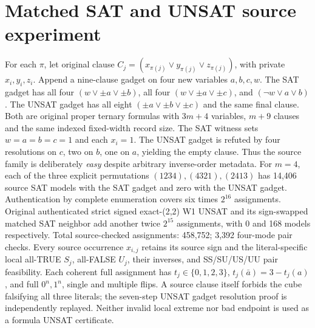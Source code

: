 \documentclass[10pt]{article}
\begin{document}
\section{Matched SAT and UNSAT source experiment}
For each $\pi$, let original clause $C_j=(x_{\pi(j)}\vee y_{\pi(j)}\vee z_{\pi(j)})$, with private $x_i,y_i,z_i$. Append a nine-clause gadget on four new variables $a,b,c,w$. The SAT gadget has all four $(w\vee\pm a\vee\pm b)$, all four $(w\vee\pm a\vee\pm c)$, and $(\neg w\vee a\vee b)$. The UNSAT gadget has all eight $(\pm a\vee\pm b\vee\pm c)$ and the same final clause. Both are original proper ternary formulas with $3m+4$ variables, $m+9$ clauses and the same indexed fixed-width record size. The SAT witness sets $w=a=b=c=1$ and each $x_i=1$. The UNSAT gadget is refuted by four resolutions on $c$, two on $b$, one on $a$, yielding the empty clause. Thus the source family is deliberately \emph{easy} despite arbitrary inverse-order metadata.
For $m=4$, each of the three explicit permutations $(1234),(4321),(2413)$ has 14,406 source SAT models with the SAT gadget and zero with the UNSAT gadget. Authentication by complete enumeration covers six times $2^{16}$ assignments. Original authenticated strict signed exact-(2,2) W1 UNSAT and its sign-swapped matched SAT neighbor add another twice $2^{15}$ assignments, with 0 and 168 models respectively. Total source-checked assignments: 458,752; 3,392 four-mode pair checks. Every source occurrence $x_{i,j}$ retains its source sign and the literal-specific local all-TRUE $S_j$, all-FALSE $U_j$, their inverses, and SS/SU/US/UU pair feasibility. Each coherent full assignment has $t_j\in\{0,1,2,3\}$, $t_j(\bar a)=3-t_j(a)$, and full $0^n,1^n$, single and multiple flips. A source clause itself forbids the cube falsifying all three literals; the seven-step UNSAT gadget resolution proof is independently replayed. Neither invalid local extreme nor bad endpoint is used as a formula UNSAT certificate.
\end{document}
